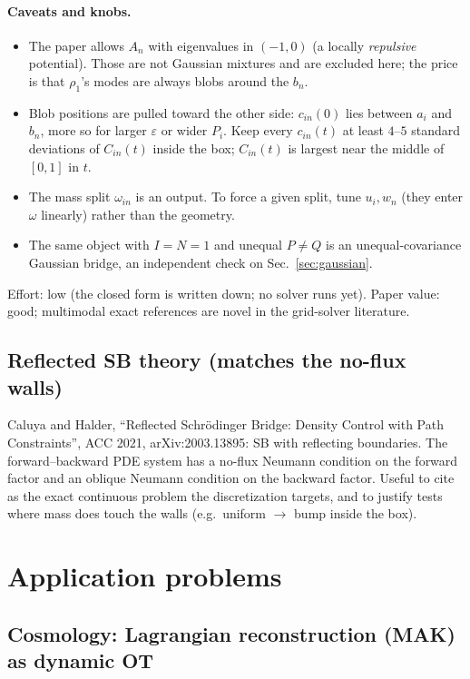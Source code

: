 \documentclass[11pt]{article}
\newcommand{\eps}{\varepsilon}
\begin{document}
\paragraph{Caveats and knobs.}
\begin{itemize}
  \item The paper allows $A_n$ with eigenvalues in $(-1,0)$ (a locally
        \emph{repulsive} potential). Those are not Gaussian mixtures and are excluded
        here; the price is that $\rho_1$'s modes are always blobs around the $b_n$.
  \item Blob positions are pulled toward the other side: $c_{in}(0)$ lies between
        $a_i$ and $b_n$, more so for larger $\eps$ or wider $P_i$. Keep every
        $c_{in}(t)$ at least $4$--$5$ standard deviations of $C_{in}(t)$ inside the
        box; $C_{in}(t)$ is largest near the middle of $[0,1]$ in $t$.
  \item The mass split $\omega_{in}$ is an output. To force a given split, tune
        $u_i,w_n$ (they enter $\omega$ linearly) rather than the geometry.
  \item The same object with $I=N=1$ and unequal $P\neq Q$ is an unequal-covariance
        Gaussian bridge, an independent check on Sec.~\ref{sec:gaussian}.
\end{itemize}
Effort: low (the closed form is written down; no solver runs yet). Paper value:
good; multimodal exact references are novel in the grid-solver literature.

\subsection{Reflected SB theory (matches the no-flux walls)}

Caluya and Halder, ``Reflected Schr\"odinger Bridge: Density Control with Path
Constraints'', ACC 2021, arXiv:2003.13895: SB with reflecting boundaries. The
forward--backward PDE system has a no-flux Neumann condition on the forward factor
and an oblique Neumann condition on the backward factor. Useful to cite as the exact
continuous problem the discretization targets, and to justify tests where mass does
touch the walls (e.g.\ uniform $\to$ bump inside the box).

\section{Application problems}
\label{sec:applications}

\subsection{Cosmology: Lagrangian reconstruction (MAK) as dynamic OT}
\label{sec:cosmo}
\end{document}
